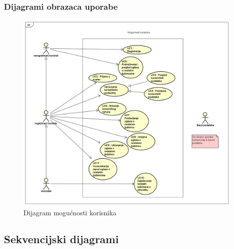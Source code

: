 					
					
					
					
				\subsubsection{Dijagrami obrazaca uporabe}
					
				\begin{figure}[H]
					\includegraphics[scale=0.45]{slike/uc_mogucnosti_korisnika.PNG} 
					\centering
					\caption{Dijagram mogućnosti korisnika}
					\label{uc_mogucnosti_korisnika}
				\end{figure}
				
			\subsection{Sekvencijski dijagrami}
				

				
